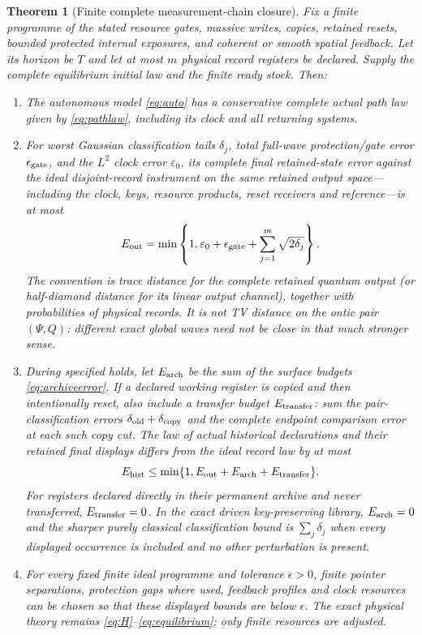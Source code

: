 \documentclass[11pt]{article}
\newtheorem{theorem}{Theorem}[section]
\theoremstyle{definition}\newtheorem{assumption}[theorem]{Constitutive assumption}
\theoremstyle{remark}\newtheorem{remark}[theorem]{Remark}
\begin{document}
\begin{theorem}[Finite complete measurement-chain closure]\label{thm:closure}
Fix a finite programme of the stated resource gates, massive writes, copies, retained resets, bounded protected internal exposures, and coherent or smooth spatial feedback. Let its horizon be $T$ and let at most $m$ physical record registers be declared. Supply the complete equilibrium initial law and the finite ready stock. Then:
\begin{enumerate}
\item The autonomous model \eqref{eq:auto} has a conservative complete actual path law given by \eqref{eq:pathlaw}, including its clock and all returning systems.
\item For worst Gaussian classification tails $\delta_j$, total full-wave protection/gate error $\epsilon_{\rm gate}$, and the $L^2$ clock error $\varepsilon_0$, its complete final retained-state error against the ideal disjoint-record instrument on the same retained output space---including the clock, keys, resource products, reset receivers and reference---is at most
\begin{equation}\label{eq:totalwave}
 E_{\rm out}=\min\left\{1,\varepsilon_0+\epsilon_{\rm gate}
                                  +\sum_{j=1}^m\sqrt{2\delta_j}\right\}.
\end{equation}
The convention is trace distance for the complete retained quantum output (or half-diamond distance for its linear output channel), together with probabilities of physical records. It is not TV distance on the ontic pair $(\Psi,Q)$: different exact global waves need not be close in that much stronger sense.
\item During specified holds, let $E_{\rm arch}$ be the sum of the surface budgets \eqref{eq:archiveerror}. If a declared working register is copied and then intentionally reset, also include a transfer budget $E_{\rm transfer}$: sum the pair-classification errors $\delta_{\rm old}+\delta_{\rm copy}$ and the complete endpoint comparison error at each such copy cut. The law of actual historical declarations and their retained final displays differs from the ideal record law by at most
\begin{equation}\label{eq:totalhist}
 E_{\rm hist}\le\min\{1,E_{\rm out}+E_{\rm arch}+E_{\rm transfer}\}.
\end{equation}
For registers declared directly in their permanent archive and never transferred, $E_{\rm transfer}=0$. In the exact driven key-preserving library, $E_{\rm arch}=0$ and the sharper purely classical classification bound is $\sum_j\delta_j$ when every displayed occurrence is included and no other perturbation is present.
\item For every fixed finite ideal programme and tolerance $\epsilon>0$, finite pointer separations, protection gaps where used, feedback profiles and clock resources can be chosen so that these displayed bounds are below $\epsilon$. The exact physical theory remains \eqref{eq:H}--\eqref{eq:equilibrium}; only finite resources are adjusted.
\end{enumerate}
\end{theorem}
\end{document}
